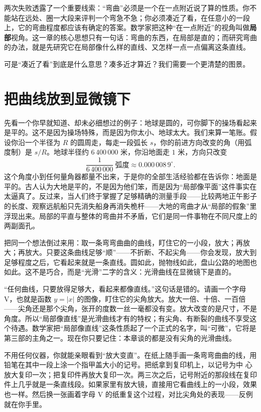 两次失败透露了一个重要线索：``弯曲''必须是一个在一点附近说了算的性质。你不能站在远处、圈一大段来评判一个弯急不急；你必须凑近了看，在任意小的一段上，它的弯曲程度都应该有确定的答案。数学家把这种``在一点附近''的视角叫做\textbf{局部}视角。这一章的核心思想只有一句话：弯曲的东西，在局部是直的；而研究弯曲的办法，就是先研究它在局部像什么样的直线、又怎样一点一点偏离这条直线。

可是``凑近了看''到底是什么意思？凑多近才算近？我们需要一个更清楚的图景。

\section{把曲线放到显微镜下}

先看一个你早就知道、却未必细想过的例子：地球是圆的，可你脚下的操场看起来是平的。这不是因为操场特殊，而是因为你太小、地球太大。我们来算一笔账。假设你沿一个半径为 $R$ 的圆周走，每走一段弧长 $s$，你的前进方向改变的角（用弧度制）是 $s/R$。地球半径约 $6\,400\,000$ 米，你沿地面走 $1$ 米，方向只改变
\[
\frac{1}{6\,400\,000}\ \text{弧度} \approx 0.000\,008\,9^\circ.
\]
这个角度小到任何量角器都量不出来，于是你的全部生活经验都在告诉你：地面是平的。古人认为大地是平的，不是因为他们笨，而是因为``局部像平面''这件事实在太逼真了。反过来，当人们终于掌握了足够精确的测量手段——比较两地正午影子的长度、观察远航船只先消失船身再消失桅杆——大地的弯曲才从``局部的假象''里浮现出来。局部的平直与整体的弯曲并不矛盾，它们是同一件事物在不同尺度上的两副面孔。

把同一个想法倒过来用：取一条弯弯曲曲的曲线，盯住它的一小段，放大；再放大；再放大。只要这条曲线足够``顺''——不折断、不起尖角——你会发现，放大到足够程度之后，它看起来就是一条直线。圆如此，抛物线如此，盘山公路的地图也如此。这不是巧合，而是``光滑''二字的含义：光滑曲线在显微镜下是直的。

\begin{fanli}
``任何曲线，只要放得足够大，看起来都像直线。''这句话是错的。请画一个字母 V，也就是函数 $y=|x|$ 的图像，盯住它的尖角放大。放大一倍、十倍、一百倍——尖角还是那个尖角，张开的度数一丝一毫都没有变。放大改变的是尺寸，不是角度。所以``局部像直线''是光滑曲线才有的特权；有尖角、有断裂的曲线不享受这个待遇。数学家把``局部像直线''这条性质起了一个正式的名字，叫``可微''，它将是第三部的主角之一。现在你只要记住：本章谈的都是没有尖角的光滑曲线。
\end{fanli}

\begin{shiyan}
不用任何仪器，你就能亲眼看到``放大变直''。在纸上随手画一条弯弯曲曲的线，用铅笔在其中一段上涂一个指甲盖大小的记号。把纸拿到复印机上，以记号为中
心放大复印一次；把复印件再放大复印一次。两三次之后，记号附近的那段线在复印件上几乎就是一条直线段。如果家里有放大镜，直接用它看曲线上的一小段，效果也一样。然后换一张画着字母 V 的纸重复这个过程，对比尖角处的表现——反例就在你手里。
\end{shiyan}

